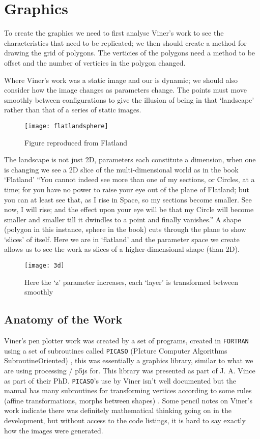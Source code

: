 \chapter{Graphics}
To create the graphics we need to first analyse Viner's work to see the
characteristics that need to be replicated; we then should create a method for
drawing the grid of polygons. The verticies of the polygons need a method to be
offset and the number of verticies in the polygon changed.

Where Viner's work was a static image and our is dynamic; we should also
consider how the image changes as parameters change. The points must move
smoothly between configurations to give the illusion of being in that
`landscape' rather than that of a series of static images.

\begin{figure}[H]
    \centering
    \texttt{[image: flatlandsphere]}
    \caption{Figure reproduced from Flatland \citep[p.112]{abbott1885flatland}}
\end{figure}

The landscape is not just 2D, parameters each constitute a dimension, when one
is changing we see a 2D slice of the multi-dimensional world as in the book
`Flatland' ``You cannot indeed see more than one of my sections, or Circles, at
a time; for you have no power to raise your eye out of the plane of Flatland;
but you can at least see that, as I rise in Space, so my sections become
smaller. See now, I will rise; and the effect upon your eye will be that my
Circle will become smaller and smaller till it dwindles to a point and finally
vanishes.'' \citep[p.112]{abbott1885flatland} A shape (polygon in this instance,
sphere in the book) cuts through the plane to show `slices' of itself. Here we
are in `flatland' and the parameter space we create allows us to see the work as
slices of a higher-dimensional shape (than 2D). 

\begin{figure}[H]
    \centering
    \texttt{[image: 3d]}
    \caption{Here the `z' parameter increases, each `layer' is transformed
    between smoothly}
\end{figure}

\section{Anatomy of the Work}
Viner's pen plotter work was created by a set of programs, created in
\verb|FORTRAN| using a set of subroutines called \verb|PICASO| (PIcture Computer
Algorithms SubroutineOriented) \citep{lycett_2016}, this was essentially a
graphics library, similar to what we are using processing / p5js for. This
library was presented as part of J. A. Vince as part of their PhD.
\verb|PICASO|'s use by Viner isn't well documented but the manual has many
subroutines for transforming vertices according to some rules (affine
transformations, morphs between shapes) \citep{picaso_manual}. Some pencil notes
on Viner's work indicate there was definitely mathematical thinking going on in
the development, but without access to the code listings, it is hard to say
exactly how the images were generated.

